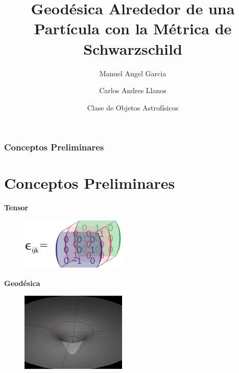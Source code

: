 \documentclass{beamer}
\title[Geodésica en Espacio de Minkowski] %
{Geodésica Alrededor de una Partícula con la Métrica de Schwarzschild}
\author[Garcia, Llanos] %
{Manuel Angel Garcia\inst{1} \and Carlos Andres Llanos\inst{2}}
\institute[] %
{
  Facultad de Física\\
  Universidad Nacional de Colombia \\
  \inst{1} mangarciama@unal.edu.co, \inst{2} cllanos@unal.edu.co
}
\date[2024] %
{Clase de Objetos Astrofísicos }
\begin{document}
\frame{\titlepage}


\begin{frame}
  \tableofcontents
\end{frame}


\begin{frame}
  \frametitle{Conceptos Preliminares}
  \section{Conceptos Preliminares}
  \textbf{Tensor }
  \begin{figure}
    \includegraphics[width=0.45\textwidth]{tensor.png}
  \end{figure}
  
  \textbf{Geodésica }
  \begin{figure}
    \includegraphics[width=0.45\textwidth]{geodesicas.png}
  \end{figure}
\end{frame}

\end{document}
